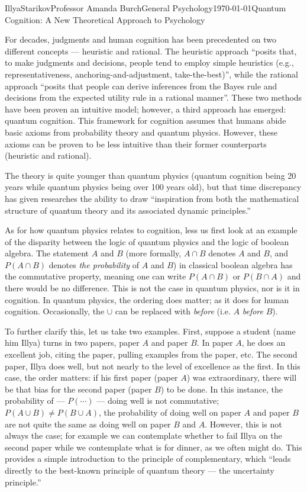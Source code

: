 \documentclass[12pt,letterpaper]{article}
\begin{document}
\begin{mla}{Illya}{Starikov}{Professor Amanda Burch}{General Psychology}{\today}{Quantum Cognition: A New Theoretical Approach to Psychology}

For decades, judgments and human cognition has been precedented on two different concepts --- heuristic and rational. The heuristic approach ``posits that, to make judgments and decisions, people tend to employ simple heuristics (e.g., representativeness, anchoring-and-adjustment, take-the-best)'', while the rational approach ``posits that people can derive inferences from the Bayes rule and decisions from the expected utility rule in a rational manner''. These two methods have been proven an intuitive model; however, a third approach has emerged: quantum cognition. This framework for cognition assumes that humans abide basic axioms from probability theory and quantum physics. However, these axioms can be proven to be less intuitive than their former counterparts (heuristic and rational).

The theory is quite younger than quantum physics (quantum cognition being 20 years while quantum physics being over 100 years old), but that time discrepancy has given researches the ability to draw ``inspiration from both the mathematical structure of quantum theory and its associated dynamic principles.''

As for how quantum physics relates to cognition, less us first look at an example of the disparity between the logic of quantum physics and the logic of boolean algebra. The statement $A$ and $B$ (more formally, $A \cap B$ denotes $A$ and $B$, and $P(A \cap B)$ denotes \textit{the probability} of $A$ and $B$) in classical boolean algebra has the commutative property, meaning one can write $P(A \cap B)$ or $P(B \cap A)$ and there would be no difference. This is not the case in quantum physics, nor is it in cognition. In quantum physics, the ordering does matter; as it does for human cognition. Occasionally, the $\cup$ can be replaced with \textit{before} (i.e. $A$ \textit{before} $B$).

To further clarify this, let us take two examples. First, suppose a student (name him Illya) turns in two papers, paper $A$ and paper $B$. In paper $A$, he does an excellent job, citing the paper, pulling examples from the paper, etc. The second paper, Illya does well, but not nearly to the level of excellence as the first. In this case, the order matters: if his first paper (paper $A$) was extraordinary, there will be that bias for the second paper (paper $B$) to be done. In this instance, the probability of --- $P(\cdots)$ --- doing well is not commutative; $P(A \cup B) \neq P(B \cup A)$, the probability of doing well on paper $A$ and paper $B$ are not quite the same as doing well on paper $B$ and $A$. However, this is not always the case; for example we can contemplate whether to fail Illya on the second paper while we contemplate what is for dinner, as we often might do. This provides a simple introduction to the principle of complementary, which ``leads directly to the best-known principle of quantum theory --- the uncertainty principle.''


\end{mla}
\end{document}
